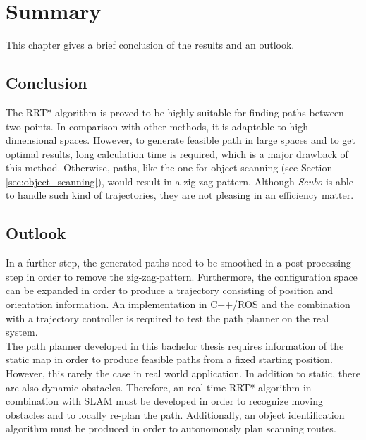 \chapter{Summary}
This chapter gives a brief conclusion of the results and an outlook.

\section{Conclusion}

The RRT* algorithm is proved to be highly suitable for finding paths between two points. In comparison with other methods, it is adaptable to high-dimensional spaces. However, to generate feasible path in large spaces and to get optimal results, long calculation time is required, which is a major drawback of this method. Otherwise, paths, like the one for object scanning (see Section \ref{sec:object_scanning}), would result in a zig-zag-pattern. Although \textit{Scubo} is able to handle such kind of trajectories, they are not pleasing in an efficiency matter.

\section{Outlook}

In a further step, the generated paths need to be smoothed in a post-processing step in order to remove the zig-zag-pattern. Furthermore, the configuration space can be expanded in order to produce a trajectory consisting of position and orientation information. An implementation in C++/ROS and the combination with a trajectory controller is required to test the path planner on the real system. \\

The path planner developed in this bachelor thesis requires information of the static map in order to produce feasible paths from a fixed starting position. However, this rarely the case in real world application. In addition to static, there are also dynamic obstacles. Therefore, an real-time RRT* algorithm in combination with SLAM must be developed in order to recognize moving obstacles and to locally re-plan the path. Additionally, an object identification algorithm must be produced in order to autonomously plan scanning routes. 

   